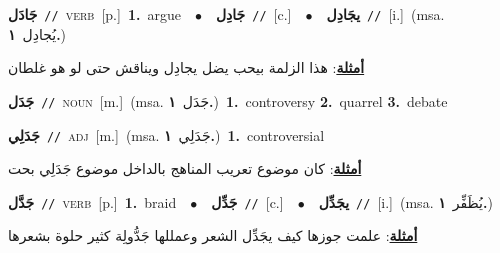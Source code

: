 \documentclass[10pt,a4paper,twoside]{article} %
\begin{document}
\begin{multicols}{2}
{\setlength\topsep{0pt}\textbf{\foreignlanguage{arabic}{جَادَل}}\ {\color{gray}\texttt{//}\color{black}}\ \textsc{verb}\ [p.]\ \textbf{1.}~argue\ \ $\bullet$\ \ \setlength\topsep{0pt}\textbf{\foreignlanguage{arabic}{جَادِل}}\ {\color{gray}\texttt{//}\color{black}}\ [c.]\ \ $\bullet$\ \ \setlength\topsep{0pt}\textbf{\foreignlanguage{arabic}{يجَادِل}}\ {\color{gray}\texttt{//}\color{black}}\ [i.]\ \color{gray}(msa. \foreignlanguage{arabic}{يُجادِل}~\foreignlanguage{arabic}{\textbf{١.}})\color{black}\  \begin{flushright}\color{gray}\foreignlanguage{arabic}{\textbf{\underline{\foreignlanguage{arabic}{أمثلة}}}: هذا الزلمة بيحب يضل يجادِل ويناقش حتى لو هو غلطان}\end{flushright}\color{black}} \vspace{2mm}

{\setlength\topsep{0pt}\textbf{\foreignlanguage{arabic}{جَدَل}}\ {\color{gray}\texttt{//}\color{black}}\ \textsc{noun}\ [m.]\ \color{gray}(msa. \foreignlanguage{arabic}{جَدَل}~\foreignlanguage{arabic}{\textbf{١.}})\color{black}\ \textbf{1.}~controversy  \textbf{2.}~quarrel  \textbf{3.}~debate\ } \vspace{2mm}

{\setlength\topsep{0pt}\textbf{\foreignlanguage{arabic}{جَدَلِي}}\ {\color{gray}\texttt{//}\color{black}}\ \textsc{adj}\ [m.]\ \color{gray}(msa. \foreignlanguage{arabic}{جَدَلِي}~\foreignlanguage{arabic}{\textbf{١.}})\color{black}\ \textbf{1.}~controversial\  \begin{flushright}\color{gray}\foreignlanguage{arabic}{\textbf{\underline{\foreignlanguage{arabic}{أمثلة}}}: كان موضوع تعريب المناهج بالداخل موضوع جَدَلِي بحت}\end{flushright}\color{black}} \vspace{2mm}

{\setlength\topsep{0pt}\textbf{\foreignlanguage{arabic}{جَدَّل}}\ {\color{gray}\texttt{//}\color{black}}\ \textsc{verb}\ [p.]\ \textbf{1.}~braid\ \ $\bullet$\ \ \setlength\topsep{0pt}\textbf{\foreignlanguage{arabic}{جَدِّل}}\ {\color{gray}\texttt{//}\color{black}}\ [c.]\ \ $\bullet$\ \ \setlength\topsep{0pt}\textbf{\foreignlanguage{arabic}{يجَدِّل}}\ {\color{gray}\texttt{//}\color{black}}\ [i.]\ \color{gray}(msa. \foreignlanguage{arabic}{يُظَفِّر}~\foreignlanguage{arabic}{\textbf{١.}})\color{black}\  \begin{flushright}\color{gray}\foreignlanguage{arabic}{\textbf{\underline{\foreignlanguage{arabic}{أمثلة}}}: علمت جوزها كيف يجَدِّل الشعر وعمللها جَدُّولِة كثير حلوة بشعرها}\end{flushright}\color{black}} \vspace{2mm}


\end{multicols}
\end{document}
